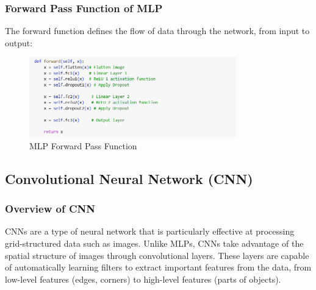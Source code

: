 \documentclass[12pt]{article}
\begin{document}
\subsubsection{Forward Pass Function of MLP}
The forward function defines the flow of data through the network, from input to output:
\begin{figure}[H]
    \centering
    \includegraphics[width=0.8\textwidth]{Screenshots/Ảnh chụp màn hình 2025-05-23 221832.png} %
    \caption{MLP Forward Pass Function}
    \label{fig:mlp_forward_pass}
\end{figure}

\subsection{Convolutional Neural Network (CNN)}
\subsubsection{Overview of CNN}
CNNs are a type of neural network that is particularly effective at processing grid-structured data such as images. Unlike MLPs, CNNs take advantage of the spatial structure of images through convolutional layers. These layers are capable of automatically learning filters to extract important features from the data, from low-level features (edges, corners) to high-level features (parts of objects).
\end{document}
